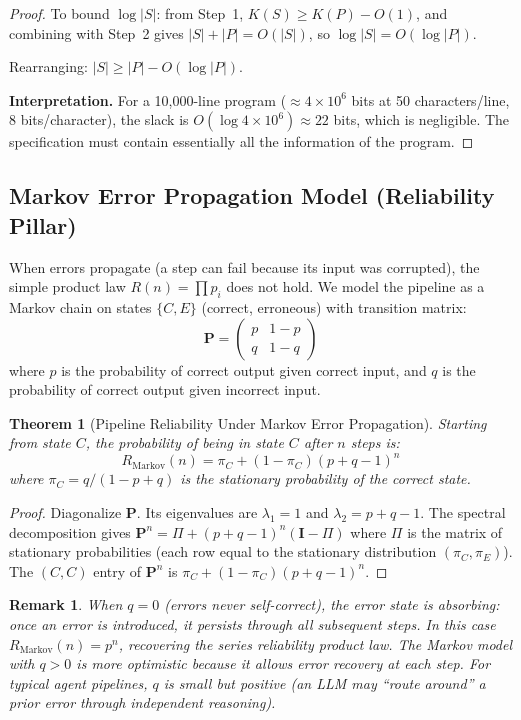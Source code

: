 \documentclass[11pt, a4paper, logo, copyright]{googledeepmind}
\newtheorem{theorem}{Theorem}[section]
\newtheorem*{remark}{Remark}
\begin{document}
\begin{appendices}
\begin{proof}
To bound $\log |S|$: from Step~1, $K(S) \geq K(P) - O(1)$, and combining
with Step~2 gives $|S| + |P| = O(|S|)$, so $\log |S| = O(\log |P|)$.

Rearranging: $|S| \geq |P| - O(\log |P|)$.

\textbf{Interpretation.} For a 10,000-line program ($\approx 4 \times 10^6$ bits
at 50 characters/line, 8 bits/character), the slack is
$O(\log 4 \times 10^6) \approx 22$ bits, which is negligible.
The specification must contain essentially all the information of the program.
\end{proof}


\subsection{Markov Error Propagation Model (Reliability Pillar)}

When errors propagate (a step can fail because its input was corrupted),
the simple product law $R(n) = \prod p_i$ does not hold.
We model the pipeline as a Markov chain on states $\{C, E\}$ (correct, erroneous)
with transition matrix:
\[
  \mathbf{P} = \begin{pmatrix} p & 1 - p \\ q & 1 - q \end{pmatrix}
\]
where $p$ is the probability of correct output given correct input,
and $q$ is the probability of correct output given incorrect input.

\begin{theorem}[Pipeline Reliability Under Markov Error Propagation]
Starting from state $C$, the probability of being in state $C$ after $n$ steps is:
\[
  R_{\mathrm{Markov}}(n) = \pi_C + (1 - \pi_C)(p + q - 1)^n
\]
where $\pi_C = q / (1 - p + q)$ is the stationary probability of the correct state.
\end{theorem}

\begin{proof}
Diagonalize $\mathbf{P}$. Its eigenvalues are $\lambda_1 = 1$ and
$\lambda_2 = p + q - 1$. The spectral decomposition gives
$\mathbf{P}^n = \Pi + (p + q - 1)^n (\mathbf{I} - \Pi)$
where $\Pi$ is the matrix of stationary probabilities (each row equal
to the stationary distribution $(\pi_C, \pi_E)$).
The $(C, C)$ entry of $\mathbf{P}^n$ is
$\pi_C + (1 - \pi_C)(p + q - 1)^n$.
\end{proof}

\begin{remark}
When $q = 0$ (errors never self-correct), the error state is absorbing:
once an error is introduced, it persists through all subsequent steps.
In this case $R_{\mathrm{Markov}}(n) = p^n$, recovering the series reliability
product law. The Markov model with $q > 0$ is more optimistic because it
allows error recovery at each step. For typical agent pipelines, $q$ is small
but positive (an LLM may ``route around'' a prior error through independent reasoning).
\end{remark}



\end{appendices}
\end{document}
